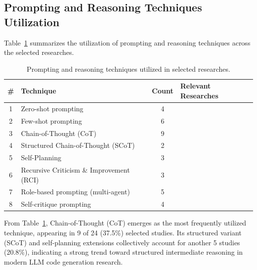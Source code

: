 \documentclass[11pt,a4paper]{article}
\begin{document}
\subsection{Prompting and Reasoning Techniques Utilization}
\label{sec:prompting_results}

Table~\ref{tab:prompting_techniques} summarizes the utilization of prompting and reasoning techniques across the selected researches.

\begin{table}[H]
\centering
\caption{Prompting and reasoning techniques utilized in selected researches.}
\label{tab:prompting_techniques}
\small
\begin{tabular}{@{}clcp{7cm}@{}}
\toprule
\textbf{\#} & \textbf{Technique} & \textbf{Count} & \textbf{Relevant Researches} \\
\midrule
1 & Zero-shot prompting & 4 & \cite{chen2021humaneval,austin2021mbpp,hendrycks2021apps,xia2023apr} \\
2 & Few-shot prompting & 6 & \cite{austin2021mbpp,li2025scot,jiang2024selfplan,wei2022cot,chen2023selfdebug,wang2024intervenor} \\
3 & Chain-of-Thought (CoT) & 9 & \cite{wei2022cot,li2025scot,jonnala2025,bai2025agent,bruni2025,ding2025codingcare,dou2026,wang2024intervenor,chen2023selfdebug} \\
4 & Structured Chain-of-Thought (SCoT) & 2 & \cite{li2025scot,zhang2025anncoder} \\
5 & Self-Planning & 3 & \cite{jiang2024selfplan,zhang2025anncoder,bai2025agent} \\
6 & Recursive Criticism \& Improvement (RCI) & 3 & \cite{bruni2025,ding2025codingcare,dou2026} \\
7 & Role-based prompting (multi-agent) & 5 & \cite{bai2025agent,zhang2025anncoder,ding2025codingcare,wang2024intervenor,frenkel2025apr} \\
8 & Self-critique prompting & 4 & \cite{dou2026,chen2023selfdebug,wang2024intervenor,zhang2024copilot} \\
\bottomrule
\end{tabular}
\end{table}

From Table~\ref{tab:prompting_techniques}, Chain-of-Thought (CoT) emerges as the most frequently utilized technique, appearing in 9 of 24 (37.5\%) selected studies. Its structured variant (SCoT) and self-planning extensions collectively account for another 5 studies (20.8\%), indicating a strong trend toward structured intermediate reasoning in modern LLM code generation research.
\end{document}
